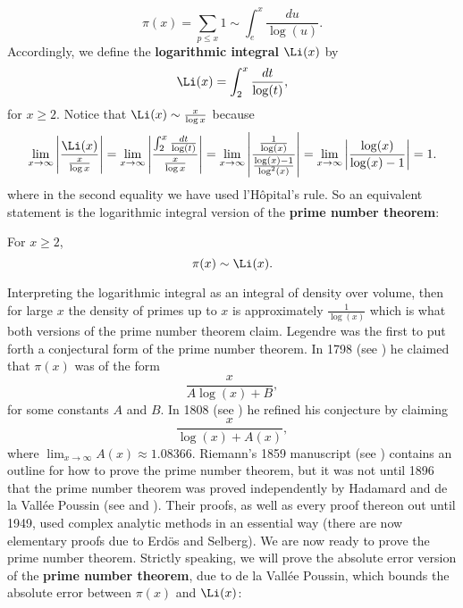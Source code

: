       \[
        \pi(x) = \sum_{p \le x}1 \sim \int_{e}^{x}\frac{du}{\log(u)}.
      \]
      Accordingly, we define the \textbf{logarithmic integral} $\Li(x)$ by
      \[
        \Li(x) = \int_{2}^{x}\frac{dt}{\log(t)},
      \]
      for $x \ge 2$. Notice that $\Li(x) \sim \frac{x}{\log{x}}$ because
      \[
        \lim_{x \to \infty}\left|\frac{\Li(x)}{\frac{x}{\log{x}}}\right| = \lim_{x \to \infty}\left|\frac{\int_{2}^{x}\frac{dt}{\log(t)}}{\frac{x}{\log{x}}}\right| = \lim_{x \to \infty}\left|\frac{\frac{1}{\log(x)}}{\frac{\log(x)-1}{\log^{2}(x)}}\right| = \lim_{x \to \infty}\left|\frac{\log(x)}{\log(x)-1}\right| = 1.
      \]
      where in the second equality we have used  l'H\^opital's rule. So an equivalent statement is the logarithmic integral version of the \textbf{prime number theorem}:

      \begin{theorem}
        For $x \ge 2$,
        \[
          \pi(x) \sim \Li(x).
        \]
      \end{theorem}

      Interpreting the logarithmic integral as an integral of density over volume, then for large $x$ the density of primes up to $x$ is approximately $\frac{1}{\log(x)}$ which is what both versions of the prime number theorem claim. Legendre was the first to put forth a conjectural form of the prime number theorem. In 1798 (see \cite{legendre1798essai}) he claimed that $\pi(x)$ was of the form
      \[
        \frac{x}{A\log(x)+B},
      \]
      for some constants $A$ and $B$. In 1808 (see \cite{legendre1808essai}) he refined his conjecture by claiming
      \[
        \frac{x}{\log(x)+A(x)},
      \]
      where $\lim_{x \to \infty}A(x) \approx 1.08366$. Riemann's 1859 manuscript (see \cite{riemann1859ueber}) contains an outline for how to prove the prime number theorem, but it was not until 1896 that the prime number theorem was proved independently by Hadamard and de la Vall\'ee Poussin (see \cite{hadamard1896distribution} and \cite{poussin1897recherches}). Their proofs, as well as every proof thereon out until 1949, used complex analytic methods in an essential way (there are now elementary proofs due to Erd\"os and Selberg). We are now ready to prove the prime number theorem. Strictly speaking, we will prove the absolute error version of the \textbf{prime number theorem}, due to de la Vall\'ee Poussin, which bounds the absolute error between $\pi(x)$ and $\Li(x)$:

